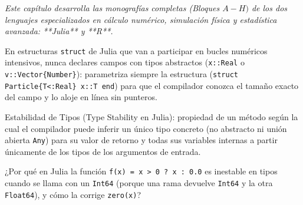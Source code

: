 \documentclass{book}
\begin{document}
\noindent\textit{Este capítulo desarrolla las monografías completas (Bloques \(A-H)\) de los dos lenguajes especializados en cálculo numérico, simulación física y estadística avanzada: **Julia** y **R**.}

\begin{tcolorbox}[title={Consejo}, studiumtip, breakable]

En estructuras \texttt{struct} de Julia que van a participar en bucles numéricos intensivos, nunca declares campos con tipos abstractos (\texttt{x::Real} o \texttt{v::Vector\{Number\}}): parametriza siempre la estructura (\texttt{struct Particle\{T<:Real\} x::T end}) para que el compilador conozca el tamaño exacto del campo y lo aloje en línea sin punteros.
\end{tcolorbox}

\begin{tcolorbox}[title={Definición}, studiumdef, breakable]

Estabilidad de Tipos (Type Stability en Julia): propiedad de un método según la cual el compilador puede inferir un único tipo concreto (no abstracto ni unión abierta \texttt{Any}) para su valor de retorno y todas sus variables internas a partir únicamente de los tipos de los argumentos de entrada.
\end{tcolorbox}

\begin{tcolorbox}[title={Autoficha}, studiumcheck, breakable]

¿Por qué en Julia la función \texttt{f(x) = x > 0 ? x : 0.0} es inestable en tipos cuando se llama con un \texttt{Int64} (porque una rama devuelve \texttt{Int64} y la otra \texttt{Float64}), y cómo la corrige \texttt{zero(x)}?
\end{tcolorbox}
\end{document}
